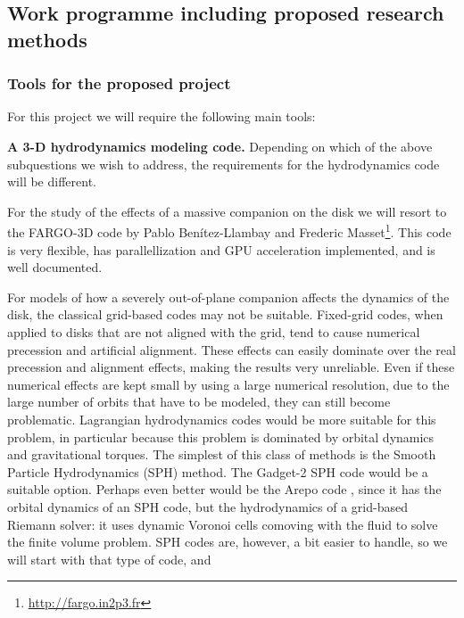 \documentclass[10pt,fleqn,twoside]{article}
\begin{document}
\subsection{Work programme including proposed research methods}

\subsubsection{Tools for the proposed project}
For this project we will require the following main tools:
\begin{compactenumerate}
\item {\bf A 3-D hydrodynamics modeling code.} Depending on which of the
  above subquestions we wish to address, the requirements for the
  hydrodynamics code will be different. 
  \begin{compactitemize}
  \item For the study of the effects of a massive companion on the disk we
    will resort to the FARGO-3D code by Pablo Ben\'itez-Llambay and Frederic
    Masset\footnote{\url{http://fargo.in2p3.fr}}. This code is very
    flexible, has parallellization and GPU acceleration implemented, and is
    well documented.
  \item For models of how a severely out-of-plane companion affects the dynamics of
    the disk, the classical grid-based codes may not be suitable. Fixed-grid
    codes, when applied to disks that are not aligned with the grid, tend to
    cause numerical precession and artificial alignment. These effects can
    easily dominate over the real precession and alignment effects, making
    the results very unreliable. Even if these numerical effects are kept
    small by using a large numerical resolution, due to the large number of
    orbits that have to be modeled, they can still become problematic.
    Lagrangian hydrodynamics codes would be more suitable for this problem,
    in particular because this problem is dominated by orbital dynamics and
    gravitational torques. The simplest of this class of methods is the
    Smooth Particle Hydrodynamics (SPH) method. The Gadget-2 SPH code
    \citep{2005MNRAS.364.1105S} would be a suitable option. Perhaps even
    better would be the Arepo code \citep{2010MNRAS.401..791S}, since it has
    the orbital dynamics of an SPH code, but the hydrodynamics of a
    grid-based Riemann solver: it uses dynamic Voronoi cells comoving with
    the fluid to solve the finite volume problem. SPH codes are, however, a
    bit easier to handle, so we will start with that type of code, and

\end{compactitemize}
\end{compactenumerate}
\end{document}
